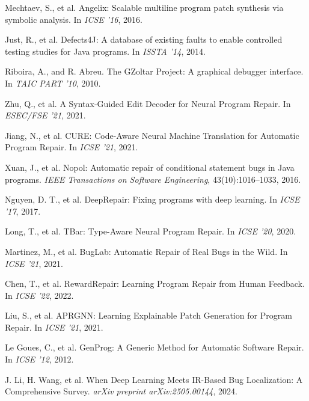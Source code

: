 \documentclass[manuscript,screen,review]{acmart}
\begin{document}
\begin{thebibliography}{99}
Mechtaev, S., et al.
\newblock Angelix: Scalable multiline program patch synthesis via symbolic analysis.
\newblock In \textit{ICSE '16}, 2016.

Just, R., et al.
\newblock Defects4J: A database of existing faults to enable controlled testing studies for Java programs.
\newblock In \textit{ISSTA '14}, 2014.

Riboira, A., and R. Abreu.
\newblock The GZoltar Project: A graphical debugger interface.
\newblock In \textit{TAIC PART '10}, 2010.

Zhu, Q., et al.
\newblock A Syntax-Guided Edit Decoder for Neural Program Repair.
\newblock In \textit{ESEC/FSE '21}, 2021.

Jiang, N., et al.
\newblock CURE: Code-Aware Neural Machine Translation for Automatic Program Repair.
\newblock In \textit{ICSE '21}, 2021.

Xuan, J., et al.
\newblock Nopol: Automatic repair of conditional statement bugs in Java programs.
\newblock \textit{IEEE Transactions on Software Engineering}, 43(10):1016--1033, 2016.

Nguyen, D. T., et al.
\newblock DeepRepair: Fixing programs with deep learning.
\newblock In \textit{ICSE '17}, 2017.

Long, T., et al.
\newblock TBar: Type-Aware Neural Program Repair.
\newblock In \textit{ICSE '20}, 2020.

Martinez, M., et al.
\newblock BugLab: Automatic Repair of Real Bugs in the Wild.
\newblock In \textit{ICSE '21}, 2021.

Chen, T., et al.
\newblock RewardRepair: Learning Program Repair from Human Feedback.
\newblock In \textit{ICSE '22}, 2022.

Liu, S., et al.
\newblock APRGNN: Learning Explainable Patch Generation for Program Repair.
\newblock In \textit{ICSE '21}, 2021.

Le Goues, C., et al.
\newblock GenProg: A Generic Method for Automatic Software Repair.
\newblock In \textit{ICSE '12}, 2012.

J. Li, H. Wang, et al.
\newblock When Deep Learning Meets IR-Based Bug Localization: A Comprehensive Survey.
\newblock \textit{arXiv preprint arXiv:2505.00144}, 2024.


\end{thebibliography}
\end{document}
